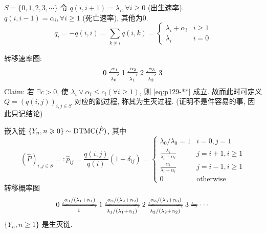 \begin{example}[生灭过程]
    $S=\{0,1,2,3,\cdots\}$ 令 $q(i,i+1)=\lambda_i,\forall i\geq 0$ (出生速率). $q(i,i-1)=\alpha_i,\forall i\geq 1$ (死亡速率), 其他为0.
    \[
    q_i=-q(i,i)=\sum_{k\neq i}q(i,k)=\begin{cases}
        \lambda_i+\alpha_i & i\geq 1\\
        \lambda_i & i=0
    \end{cases}
    \]
\end{example}
转移速率图:
\[
0
\xleftrightharpoons[\lambda_0]{\alpha_1} 1
\xleftrightharpoons[\lambda_1]{\alpha_2} 2
\xleftrightharpoons[\lambda_2]{\alpha_3} 3
\]
Claim: 若 $\exists c>0$, 使 $\lambda_i\lor \alpha_i\leq c_i(\forall i\geq 1)$, 则 \eqref{eq:p129-**} 成立. 故而此时可定义 $Q=(q(i,j))_{i,j\in S}$ 对应的跳过程, 称其为生灭过程. (证明不是件容易的事, 因此只记结论)

嵌入链 $\{Y_n,n\geqslant 0\}\sim\operatorname{DTMC}(\hat{P})$, 其中
\[
(\hat{P})_{i,j\in S}=: \hat{p}_{ij}=\frac{q(i,j)}{q(i)}(1-\delta_{ij})=
\begin{cases}
    \lambda_0/\lambda_0=1 & i=0,j=1\\
    \frac{\lambda_i}{\lambda_i+\alpha_i} & j=i+1,i\geq 1\\
    \frac{\alpha_i}{\lambda_i+\alpha_i} & j=i-1,i\geq 1\\
    0 & \text{otherwise}
\end{cases}
\]
转移概率图
\[
0
\xleftrightharpoons[1]{\alpha_1/(\lambda_1+\alpha_1)} 1
\xleftrightharpoons[\lambda_1/(\lambda_1+\alpha_1)]{\alpha_2/(\lambda_2+\alpha_2)} 2
\xleftrightharpoons[\lambda_2/(\lambda_2+\alpha_2)]{\alpha_3/(\lambda_3+\alpha_3)} 3
\xleftrightharpoons[]{}\cdots
\]
$\{Y_n,n\geq 1\}$ 是生灭链.

